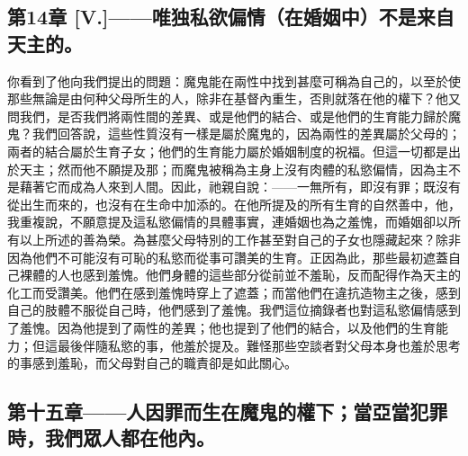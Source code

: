 
\subsection{第14章 [V.]——唯独私欲偏情（在婚姻中）不是来自天主的。}

你看到了他向我們提出的問題：魔鬼能在兩性中找到甚麼可稱為自己的，以至於使那些無論是由何种父母所生的人，除非在基督內重生，否則就落在他的權下？他又問我們，是否我們將兩性間的差異、或是他們的結合、或是他們的生育能力歸於魔鬼？我們回答說，這些性質沒有一樣是屬於魔鬼的，因為兩性的差異屬於父母的；兩者的結合屬於生育子女；他們的生育能力屬於婚姻制度的祝福。但這一切都是出於天主；然而他不願提及那；而魔鬼被稱為主身上沒有肉體的私慾偏情，因為主不是藉著它而成為人來到人間。因此，祂親自說：——一無所有，即沒有罪；既沒有從出生而來的，也沒有在生命中加添的。在他所提及的所有生育的自然善中，他，我重複說，不願意提及這私慾偏情的具體事實，連婚姻也為之羞愧，而婚姻卻以所有以上所述的善為榮。為甚麼父母特別的工作甚至對自己的子女也隱藏起來？除非因為他們不可能沒有可恥的私慾而從事可讚美的生育。正因為此，那些最初遮蓋自己裸體的人也感到羞愧。他們身體的這些部分從前並不羞恥，反而配得作為天主的化工而受讚美。他們在感到羞愧時穿上了遮蓋；而當他們在違抗造物主之後，感到自己的肢體不服從自己時，他們感到了羞愧。我們這位摘錄者也對這私慾偏情感到了羞愧。因為他提到了兩性的差異；他也提到了他們的結合，以及他們的生育能力；但這最後伴隨私慾的事，他羞於提及。難怪那些空談者對父母本身也羞於思考的事感到羞恥，而父母對自己的職責卻是如此關心。\par


\subsection{第十五章——人因罪而生在魔鬼的權下；當亞當犯罪時，我們眾人都在他內。}

